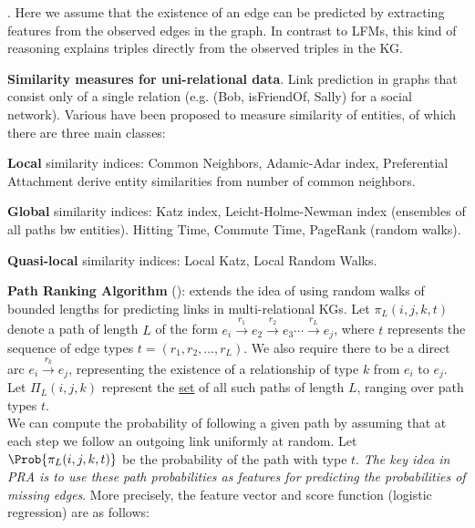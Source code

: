 \documentclass[11pt]{article}
\begin{document}
\myspace
\p {}. Here we assume that the existence of an edge can be predicted by extracting features from the observed edges in the graph. In contrast to LFMs, this kind of reasoning explains triples directly from the observed triples in the KG.
\begin{compactitem}[-]
	\item \textbf{Similarity measures for uni-relational data}. Link prediction in graphs that consist only of a single relation (e.g. (Bob, isFriendOf, Sally) for a social network). Various  have been proposed to measure similarity of entities, of which there are three main classes:
	\begin{compactenum}
		\item \textbf{Local} similarity indices: Common Neighbors, Adamic-Adar index, Preferential Attachment derive entity similarities from number of common neighbors.
		
		\item \textbf{Global} similarity indices: Katz index, Leicht-Holme-Newman index (ensembles of all paths bw entities). Hitting Time, Commute Time, PageRank (random walks). 
		
		\item \textbf{Quasi-local} similarity indices: Local Katz, Local Random Walks.
	\end{compactenum}
	
	\item \textbf{Path Ranking Algorithm} (): extends the idea of using random walks of bounded lengths for predicting links in multi-relational KGs. Let $\pi_L(i,j,k,t)$ denote a path of length $L$ of the form  $e_i \xrightarrow{r_1} e_2 \xrightarrow{r_2} e_3 \cdots \xrightarrow{r_L} e_j$, where $t$ represents the sequence of edge types $t = (r_1, r_2, \ldots, r_L)$. We also require there to be a direct arc $e_i \xrightarrow{r_k} e_j$, representing the existence of a relationship of type $k$ from $e_i$ to $e_j$. Let $\Pi_L(i,j,k)$ represent the \underline{set} of all such paths of length $L$, ranging over path types $t$. \\
	
	\p We can compute the probability of following a given path by assuming that at each step we follow an outgoing link uniformly at random. Let $\Prob{\pi_L(i,j,k,t)}$ be the probability of the path with type $t$. \textit{The key idea in PRA is to use these path probabilities as features for predicting the probabilities of missing edges}. More precisely, the feature vector and score function (logistic regression) are as follows:
\end{compactitem}
\end{document}
